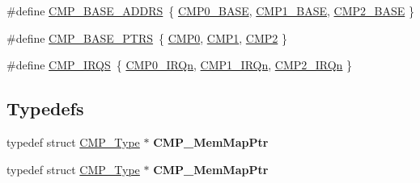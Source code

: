 \begin{DoxyCompactItemize}
\item 
\#define \hyperlink{group__CMP__Peripheral__Access__Layer_gad9f05fa33dbe017e0dd089dab69067d7}{C\+M\+P\+\_\+\+B\+A\+S\+E\+\_\+\+A\+D\+D\+RS}~\{ \hyperlink{group__CMP__Peripheral__Access__Layer_gaa174cde56b35e3d6a74b2a752296c268}{C\+M\+P0\+\_\+\+B\+A\+SE}, \hyperlink{group__CMP__Peripheral__Access__Layer_ga890dc341ab8c2c9f71f9840cda07b9cb}{C\+M\+P1\+\_\+\+B\+A\+SE}, \hyperlink{group__CMP__Peripheral__Access__Layer_ga7e986bf6335f75207120a0ee5b84d1c6}{C\+M\+P2\+\_\+\+B\+A\+SE} \}
\item 
\#define \hyperlink{group__CMP__Peripheral__Access__Layer_gacc69654296499d45b2060956a3c8e97f}{C\+M\+P\+\_\+\+B\+A\+S\+E\+\_\+\+P\+T\+RS}~\{ \hyperlink{group__CMP__Peripheral__Access__Layer_ga2cf98276319113bb5d9ece4d7d7ed09d}{C\+M\+P0}, \hyperlink{group__CMP__Peripheral__Access__Layer_ga4feda05828d32e7b657d871ccf105538}{C\+M\+P1}, \hyperlink{group__CMP__Peripheral__Access__Layer_ga023ff9e161b651f7f47e0457fe0c1fcb}{C\+M\+P2} \}
\item 
\#define \hyperlink{group__CMP__Peripheral__Access__Layer_ga2497116c7859b3f4e8fe3e1b21a84cd9}{C\+M\+P\+\_\+\+I\+R\+QS}~\{ \hyperlink{group__Interrupt__vector__numbers_gga666eb0caeb12ec0e281415592ae89083a869842c366512b0bc4c29e77e8b32217}{C\+M\+P0\+\_\+\+I\+R\+Qn}, \hyperlink{group__Interrupt__vector__numbers_gga666eb0caeb12ec0e281415592ae89083abaff5e6d9673daa434f70c41f4c94e0a}{C\+M\+P1\+\_\+\+I\+R\+Qn}, \hyperlink{group__Interrupt__vector__numbers_gga666eb0caeb12ec0e281415592ae89083a753cddaa43344f95b8305a872a7d0b1c}{C\+M\+P2\+\_\+\+I\+R\+Qn} \}
\end{DoxyCompactItemize}
\subsection*{Typedefs}
\begin{DoxyCompactItemize}
\item 
typedef struct \hyperlink{structCMP__Type}{C\+M\+P\+\_\+\+Type} $\ast$ {\bfseries C\+M\+P\+\_\+\+Mem\+Map\+Ptr}\hypertarget{group__CMP__Peripheral__Access__Layer_gad7bff9ded6421471c40ec46ca6c69e64}{}\label{group__CMP__Peripheral__Access__Layer_gad7bff9ded6421471c40ec46ca6c69e64}

\item 
typedef struct \hyperlink{structCMP__Type}{C\+M\+P\+\_\+\+Type} $\ast$ {\bfseries C\+M\+P\+\_\+\+Mem\+Map\+Ptr}\hypertarget{group__CMP__Peripheral__Access__Layer_gad7bff9ded6421471c40ec46ca6c69e64}{}\label{group__CMP__Peripheral__Access__Layer_gad7bff9ded6421471c40ec46ca6c69e64}

\end{DoxyCompactItemize}


